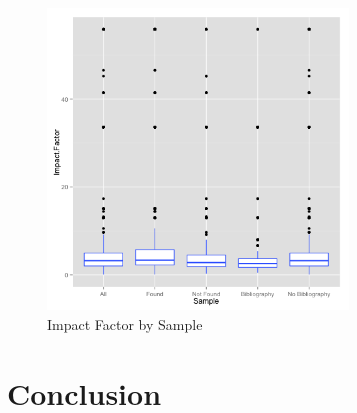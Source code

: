 \documentclass[12pt]{article}
\begin{document}
\begin{figure}
\begin{center}
\includegraphics[height=8cm]{impacts.png}
\caption{Impact Factor by Sample}
\label{fig:impacts}
\end{center}
\end{figure}



\section{Conclusion}



\clearpage
\singlespace

\nocite{*}

\clearpage
\end{document}
